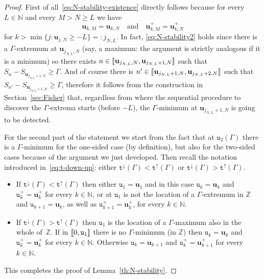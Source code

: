\documentclass[AHL,Unicode,longabstracts,published]{cedram}
\newcommand{\bfu}{\mathbf{u}}
\newcommand{\bbN}{\mathbb{N}}
\newcommand{\bbZ}{\mathbb{Z}}
\newcommand{\gG}{\Gamma}
\renewcommand*\ss{\mathtt{u}}
\newcommand{\ttt}{\mathtt{t}}
\newcommand{\tu}{\ss}
\newcommand{\llbracket}{\mathopen{[\mkern -2.7mu[}}
\newcommand{\rrbracket}{\mathclose{]\mkern -2.7mu]}}
\newcommand{\lbra}{\llbracket}
\newcommand{\rbra}{\rrbracket}
\begin{document}
\begin{proof}
First of all~\eqref{eq:N-stability-existence} directly follows because for every $L \in \bbN$ and every $M> N \ge L$ we have
\begin{equation}\label{eq:N-stability2}
\bfu_{k, M}= \bfu_{k, N}
\quad\text{and}\quad \bfu^+_{k, M}= \bfu^+_{k, N}
\end{equation}
for $k> \min\{j: \bfu_{j, N}\ge -L\}=: j_{N,L}$. In fact, \eqref{eq:N-stability2} holds since there is a $\gG$-extremum at $\bfu_{j_{N, L}, N}$ (say, a maximum: the argument is strictly analogous if it is a minimum) so there exists $n\in \lbra \bfu_{j_{N, L}, N}, \bfu_{j_{N, L}+1, N}\rbra$ such that $S_n-S_{ \bfu_{j_{N, L}+1, N}}\ge \gG$. And of course there is $n'\in \lbra \bfu_{j_{N, L}+1, N}, \bfu_{j_{N, L}+2, N}\rbra$ such that $S_{n'}-S_{ \bfu_{j_{N, L}+1, N}}\ge \gG$, therefore it follows from the construction in Section~\ref{sec:Fisher} that, regardless from where the sequential procedure to discover the $\gG$-extrema starts (before $-L$), the $\gG$-minimum at $\bfu_{j_{N, L}+1, N}$ is going to be detected.

For the second part of the statement we start from the fact that at $\tu_2(\gG)$ there is a $\gG$-minimum for the one-sided case (by definition), but also for the two-sided cases because of the argument we just developed. Then recall the notation introduced in~\eqref{eq:t-down-up}: either $\ttt^\downarrow(\gG)< \ttt^\uparrow(\gG)$ or $\ttt^\downarrow(\gG)> \ttt^\uparrow(\gG)$.
\begin{itemize}
\item If $\ttt^\downarrow(\gG)< \ttt^\uparrow(\gG)$ then either $\ss_1 =\bfu_1$ and in this case $\ss_k=\bfu_k$ and $\ss^+_k=\bfu^+_k$ for every $k \in \bbN$, or at $\ss_1$ is not the location of a $\gG$-extremum in $\bbZ$ and $\ss_{k+1}=\bfu_k$, as well as $\ss^+_{k+1}=\bfu^+_k$, for every $k \in \bbN$.
\item If $\ttt^\downarrow(\gG)> \ttt^\uparrow(\gG)$ then $\ss_1$ is the location of a $\gG$-maximum also in the whole of~$\bbZ$. If in $\lbra0, \ss_1\rbra$ there is no $\gG$-minimum (in $\bbZ$) then $\ss_k=\bfu_k$ and $\ss^+_k=\bfu^+_k$ for every $k \in \bbN$. Otherwise $\ss_k=\bfu_{k+1}$ and $\ss^+_k=\bfu^+_{k+1}$ for every $k \in \bbN$.
\end{itemize}


This completes the proof of Lemma~\ref{th:N-stability}.
\end{proof}
\end{document}
